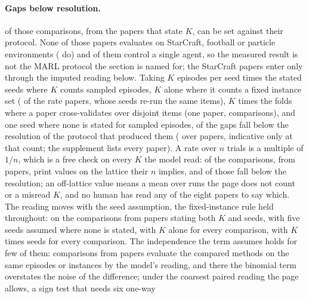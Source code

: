 \documentclass[sigconf,anonymous]{aamas}
\begin{document}
\paragraph{Gaps below resolution.} \nPtwoResTypedN{} of those
comparisons, from the \nPtwoResTypedPapers{} papers that state $K$, can be
set against their protocol. None of those papers evaluates on StarCraft,
football or particle environments (\nPtwoKPapersMarlBench{} do) and
\nPtwoKPapersSingle{} of them control a single agent, so the measured
result is not the MARL protocol the section is named for; the StarCraft
papers enter only through the imputed reading below. Taking $K$ episodes
per seed times the stated seeds where $K$ counts sampled episodes, $K$
alone where it counts a fixed instance set (\nPtwoRatePapersFixed{} of
the \nPtwoRatePapers{} rate papers, whose seeds re-run the same items),
$K$ times the folds where a paper cross-validates over disjoint items
(one paper, \nPtwoResTypedCvFolds{} comparisons), and one seed where none
is stated for sampled episodes, \nPtwoResTypedBelow{} of the gaps fall
below the resolution of the protocol that produced them
(\nPtwoResTypedBelowPaperCi{} over \nPtwoResTypedPapers{} papers,
indicative only at that count; the supplement lists every paper). A rate
over $n$ trials is a multiple of $1/n$, which is a free check on every
$K$ the model read: \nPtwoResTypedLatticeConsistent{} of the
\nPtwoResTypedN{} comparisons, from \nPtwoResTypedLatticeConsistentPapers{}
papers, print values on the lattice their $n$ implies, and
\nPtwoResTypedLatticeBelowPct{} of those fall below the resolution; an
off-lattice value means a mean over runs the page does not count or a
misread $K$, and no human has read any of the eight papers to say which.
The
reading moves with the seed assumption, the fixed-instance rule held
throughout: \nPtwoSpanSeedsStatedOnlyBelow{} on the
\nPtwoSpanSeedsStatedOnlyN{} comparisons from
\nPtwoSpanSeedsStatedOnlyPapers{} papers stating both $K$ and seeds,
\nPtwoSpanSeedsStatedOrFiveBelow{} with five seeds assumed where none is
stated, \nPtwoSpanSeedsOneForAllBelow{} with $K$ alone for every
comparison, \nPtwoSpanKTimesSeedsForAllBelow{} with $K$ times seeds for
every comparison. The independence the term assumes holds for few of
them: \nPtwoResTypedSharedN{} comparisons from
\nPtwoResTypedSharedPapers{} papers evaluate the compared methods on the
same episodes or instances by the model's reading, and there the
binomial term overstates the noise of the difference; under the coarsest
paired reading the page allows, a sign test that needs six one-way
\end{document}
